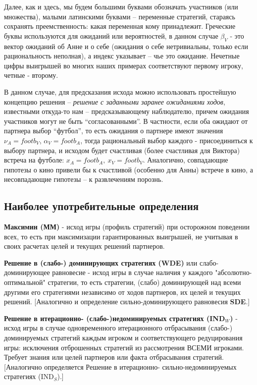 \documentclass[a4paper,12pt]{article}
\begin{document}
\begin{exmp}
{{\small Далее, как и здесь, мы будем большими буквами
обозначать участников (или множества), малыми латинскими
буквами -- переменные стратегий, стараясь сохранять
преемственность: какая переменная кому принадлежит.
Греческие буквы используются для ожиданий или вероятностей,
в данном случае  $\beta_V$ - это вектор ожиданий об Анне и
о себе (ожидания о себе нетривиальны, только если
рациональность неполная), а индекс указывает -- чье это
ожидание. Нечетные цифры выигрышей во многих наших примерах
соответствуют первому игроку, четные -
второму.}\vspace{2mm}

В данном случае, для предсказания исхода можно использовать
простейшую концепцию решения -- {\em решение с заданными заранее
ожиданиями ходов}, известными откуда-то нам -- предсказывающему
наблюдателю, причем ожидания участников могут не быть
``согласованными''. В частности, если оба ожидают от партнера
выбор ``футбол'', то есть ожидания о партнере имеют значения
$\nu_A=footb_V$, $\alpha_V=footb_A$,
тогда рациональный выбор каждого - присоединиться к выбору
партнера, и исходом будет счастливая (более счастливая для
Виктора) встреча на футболе: $x_A=footb_A,~x_V=footb_V$.
Аналогично, совпадающие гипотезы о кино привели бы к счастливой
(особенно для Анны) встрече в кино, а несовпадающие гипотезы --
к развлечениям порознь.

}\end{exmp}

\subsection{Наиболее употребительные определения}

\textbf{Максимин (ММ)} - исход игры (профиль
стратегий) при осторожном поведении всех, то есть
при максимизации гарантированных выигрышей, не
учитывая в своих расчетах целей и текущих решений
партнеров.\vspace{2mm}

\textbf{Решение в (слабо-) доминирующих стратегиях
(WDE)} или слабо-доминирующее равновесие - исход
игры в случае наличия у каждого
"абсолютно-оптимальной" стратегии, то есть
стратегии, (слабо) доминирующей над всеми другими
его стратегиями независимо от ходов партнеров, их
целей и текущих решений. [Аналогично и определение
сильно-доминирующего равновесия
\textbf{SDE}.]\vspace{2mm}

\textbf{Решение в итерационно-
(слабо-)недоминируемых стратегиях (IND${}_W$)} -
исход игры в случае одновременного итерационного
отбрасывания (слабо-) доминируемых стратегий каждым
игроком и соответствующего редуцирования игры:
исключения отброшенных стратегий из рассмотрения
ВСЕМИ игроками. Требует знания или целей партнеров
или факта отбрасывания стратегий. [Аналогично
определяется Решение в итерационно-
сильно-недоминируемых стратегиях
(IND${}_S$).]\vspace{2mm}
\end{document}
